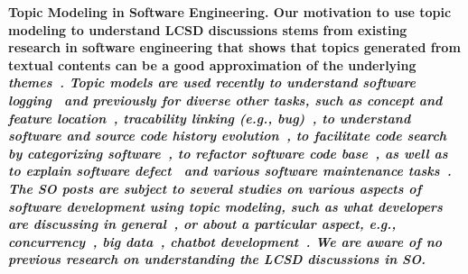 \nd\bf{Topic Modeling in Software Engineering.} Our motivation to use topic modeling to understand  LCSD discussions stems from
existing research in software engineering that shows that topics generated from
textual contents can be a good approximation of the underlying
\it{themes}~\cite{Chen-SurveyTopicInSE-EMSE2016,Sun-SoftwareMaintenanceHistoryTopic-CIS2015,Sun-ExploreTopicModelSurvey-SNPD2016}.
Topic models are used recently to understand software
logging~\cite{Li-StudySoftwareLoggingUsingTopic-EMSE2018} and previously for
diverse other tasks, such as concept and feature
location~\cite{Cleary-ConceptLocationTopic-EMSE2009,Poshyvanyk-FeatureLocationTopic-TSE2007},
tracability linking (e.g.,
bug)~\cite{Rao-TraceabilityBugTopic-MSR2011,AsuncionTylor-TopicModelingTraceabilityWithLDA-ICSE2010a},
to understand software and source code history
evolution~\cite{Hu-EvolutionDynamicTopic-SANER2015,Thomas-SoftwareEvolutionUsingTopic-SCP2014,Thomas-EvolutionSourceCodeHistoryTopic-MSR2011},
to facilitate code search by categorizing
software~\cite{Tian-SoftwareCategorizeTopic-MSR2009}, to refactor software code
base~\cite{Bavota-RefactoringTopic-TSE2014}, as well as to explain software
defect~\cite{Chen-SoftwareDefectTopic-MSR2012} and various software maintenance
tasks~\cite{Sun-SoftwareMaintenanceTopic-IST2015,Sun-SoftwareMaintenanceHistoryTopic-CIS2015}.
The SO posts are subject to several studies on various aspects
of software development using topic modeling, such as what developers are
discussing in general~\cite{Barua-StackoverflowTopics-ESE2012}, or about a
particular aspect, e.g., concurrency~\cite{Ahmed-ConcurrencyTopic-ESEM2018}, big
data~\cite{Bagherzadeh2019}, chatbot development~\cite{abdellatifchallenges}.
We are aware of no previous research on understanding
the  LCSD discussions in SO.
% 
% 
